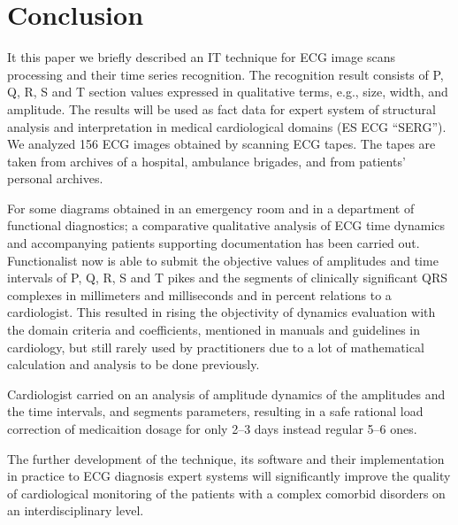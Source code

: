 \documentclass[runningheads]{AIIT}
\begin{document}
\section*{Conclusion}
It this paper we briefly described an IT technique for ECG image scans processing and their time series recognition.  The recognition result consists of P, Q, R, S and T section values expressed in qualitative terms, e.g., size, width, and amplitude.  The results will be used as fact data for expert system of structural analysis and interpretation in medical cardiological domains (ES ECG ``SERG'').  We analyzed 156 ECG images obtained by scanning ECG tapes.  The tapes are taken from archives of a hospital, ambulance brigades, and from patients' personal archives.

For some diagrams obtained in an emergency room and in a department of functional diagnostics; a comparative qualitative analysis of ECG time dynamics and accompanying patients supporting documentation has been carried out.  Functionalist now is able to submit the objective values of amplitudes and time intervals of P, Q, R, S and T pikes and the segments of clinically significant QRS complexes in millimeters and milliseconds and in percent relations to a cardiologist.  This resulted in rising the objectivity of dynamics evaluation with the domain criteria and coefficients, mentioned in manuals and guidelines in cardiology, but still rarely used by practitioners due to a lot of mathematical calculation and analysis to be done previously.

Cardiologist carried on an analysis of amplitude dynamics of the amplitudes and the time intervals, and segments parameters, resulting in a safe rational load correction of medicaition dosage for only 2--3 days instead regular 5--6 ones.

The further development of the technique, its software and their implementation in practice to ECG diagnosis expert systems will significantly improve the quality of cardiological monitoring of the patients with a complex comorbid disorders on an interdisciplinary level.
\end{document}
